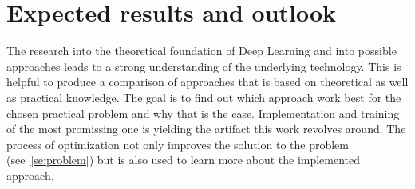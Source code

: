 \section{Expected results and outlook}
The research into the theoretical foundation of Deep Learning and into possible approaches leads
to a strong understanding of the underlying technology.
This is helpful to produce a comparison of approaches that is based on theoretical as well as
practical knowledge.
The goal is to find out which approach work best for the chosen practical problem and why that is the
case.
Implementation and training of the most promissing one is yielding the artifact this work revolves
around.
The process of optimization not only improves the solution to the problem (see~\ref{se:problem}) but
is also used to learn more about the implemented approach.

